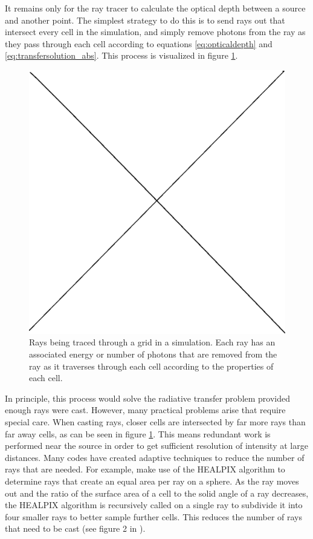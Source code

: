 It remains only for the ray tracer to calculate the optical depth between a source and another point. The simplest strategy to do this is to send rays out that intersect every cell in the simulation, and simply remove photons from the ray as they pass through each cell according to equations \ref{eq:opticaldepth} and \ref{eq:transfersolution_abs}. This process is visualized in figure \ref{fig:raytracing}.

\begin{figure}
\includegraphics[width=\textwidth]{graphics/placeholder.eps}
\caption[A visualization of ray tracing.]{Rays being traced through a grid in a simulation. Each ray has an associated energy or number of photons that are removed from the ray as it traverses through each cell according to the properties of each cell.}
\label{fig:raytracing}
\end{figure}

In principle, this process would solve the radiative transfer problem provided enough rays were cast. However, many practical problems arise that require special care. When casting rays, closer cells are intersected by far more rays than far away cells, as can be seen in figure \ref{fig:raytracing}. This means redundant work is performed near the source in order to get sufficient resolution of intensity at large distances. Many codes have created adaptive techniques to reduce the number of rays that are needed. For example, \citet{abelWandelt02} make use of the HEALPIX algorithm \citep{gorskiEt99} to determine rays that create an equal area per ray on a sphere. As the ray moves out and the ratio of the surface area of a cell to the solid angle of a ray decreases, the HEALPIX algorithm is recursively called on a single ray to subdivide it into four smaller rays to better sample further cells. This reduces the number of rays that need to be cast (see figure 2 in \citet{abelWandelt02}).


